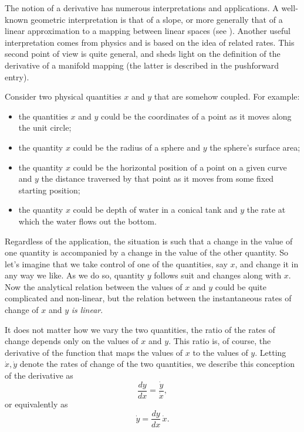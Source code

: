 \documentclass[12pt]{article}
\begin{document}
The notion of a derivative has numerous interpretations and
applications.  A well-known geometric interpretation is that of a
slope, or more generally that of a linear approximation to a mapping
between linear spaces (see ).  Another useful
interpretation comes from physics and is based on the idea of related
rates.  This second point of view is quite general, and sheds light on
the definition of the derivative of a manifold mapping (the latter is
described in the pushforward entry).

Consider two physical quantities $x$ and $y$ that are somehow coupled.
For example:
\begin{itemize}
\item the quantities $x$ and $y$ could be the coordinates of a point as it
  moves along the unit circle; 
\item the quantity $x$ could be the radius of a sphere
  and $y$ the sphere's surface area; 
\item the quantity $x$ could be the horizontal position of a point on
  a given curve and $y$ the distance traversed by that point as it
  moves from some fixed starting position;
\item the quantity $x$ could be depth of water in a conical tank and
  $y$ the rate at which the water flows out the bottom.
\end{itemize}
Regardless of the application, the situation is such that a change in
the value of one quantity is accompanied by a change in the value of
the other quantity.  So let's imagine that we take control of one of
the quantities, say $x$, and change it in any way we like.  As we do
so, quantity $y$ follows suit and changes along with $x$.  Now the
analytical relation between the values of $x$ and $y$ could be quite
complicated and non-linear, but the relation between the instantaneous
rates of change of $x$ and $y$ {\em is linear}. 

It does not matter how we vary the two quantities, the ratio of the
rates of change depends only on the values of $x$ and $y$.  This ratio
is, of course, the derivative of the function that maps the values of
$x$ to the values of $y$.  Letting $\dot{x}, \dot{y}$ denote the rates
of change of the two quantities, we describe this conception of the
derivative as
$$  \frac{dy}{dx} = \frac{\dot{y}}{\dot{x}},$$
or equivalently as
\begin{equation}
  \label{eq:deriv}
  \dot{y} = \frac{dy}{dx}\,  \dot{x}.
\end{equation}
\end{document}
